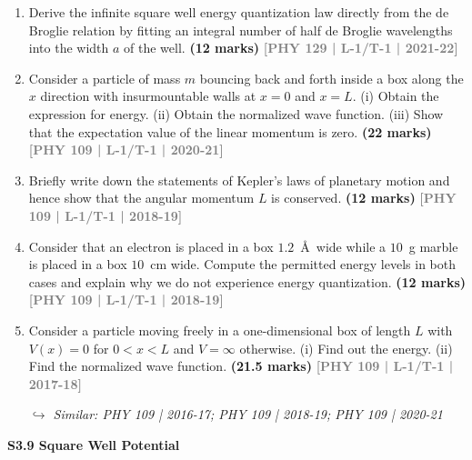 \documentclass[12pt,a3paper]{article}
\newcommand{\yr}[1]{\hfill\textcolor{gray}{\small\textbf{[#1]}}}
\newcommand{\mk}[1]{\textcolor{orange!70!black}{\small\textbf{(#1 marks)}}}
\newcommand{\variant}[1]{\par\vspace{1pt}\textcolor{blue!50!black}%
  {\footnotesize\textit{$\hookrightarrow$ Similar: #1}}}
\newcommand{\subtopic}[2]{%
  \vspace{10pt}
  \noindent\begin{tcolorbox}[colback=#1!8,colframe=#1,boxrule=0.6pt,arc=4pt,
    left=6pt,right=6pt,top=4pt,bottom=4pt]
    \small\bfseries\textcolor{#1}{#2}
  \end{tcolorbox}
  \vspace{2pt}
}
\begin{document}
\begin{enumerate}

\item Derive the infinite square well energy quantization law directly from the de Broglie relation by fitting an integral number of half de Broglie wavelengths into the width $a$ of the well.
\mk{12} \yr{PHY 129 | L-1/T-1 | 2021-22}

\item Consider a particle of mass $m$ bouncing back and forth inside a box along the $x$ direction with insurmountable walls at $x = 0$ and $x = L$. (i) Obtain the expression for energy. (ii) Obtain the normalized wave function. (iii) Show that the expectation value of the linear momentum is zero.
\mk{22} \yr{PHY 109 | L-1/T-1 | 2020-21}

\item Briefly write down the statements of Kepler's laws of planetary motion and hence show that the angular momentum $L$ is conserved.
\mk{12} \yr{PHY 109 | L-1/T-1 | 2018-19}

\item Consider that an electron is placed in a box $1.2$~\AA\ wide while a $10$~g marble is placed in a box $10$~cm wide. Compute the permitted energy levels in both cases and explain why we do not experience energy quantization.
\mk{12} \yr{PHY 109 | L-1/T-1 | 2018-19}

\item Consider a particle moving freely in a one-dimensional box of length $L$ with $V(x) = 0$ for $0 < x < L$ and $V = \infty$ otherwise. (i) Find out the energy. (ii) Find the normalized wave function.
\mk{21.5} \yr{PHY 109 | L-1/T-1 | 2017-18}
\variant{PHY 109 | 2016-17; PHY 109 | 2018-19; PHY 109 | 2020-21}

\end{enumerate}

\label{sec:s39}
\subtopic{cA}{S3.9 \quad Square Well Potential}
\end{document}
